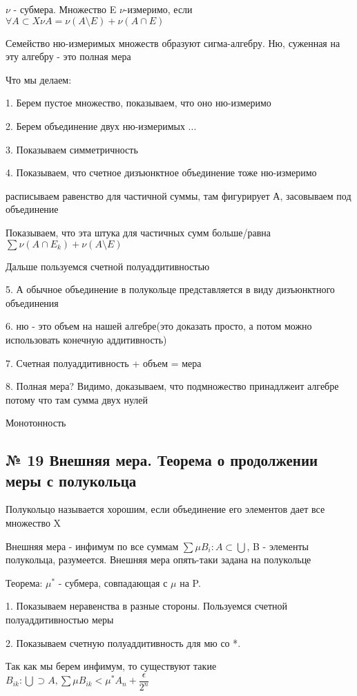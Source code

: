 \documentclass{article}
\begin{document}
$\nu$ - субмера. Множество E $\nu$-измеримо, если $\forall A \subset X \nu A = \nu (A \setminus E) + \nu (A \cap E)$

Семейство ню-измеримых множеств образуют сигма-алгебру. Ню, суженная на эту алгебру - это полная мера

Что мы делаем:

1. Берем пустое множество, показываем, что оно ню-измеримо

2. Берем объединение двух ню-измеримых ...

3. Показываем симметричность

4. Показываем, что счетное дизъюнктное объединение тоже ню-измеримо

расписываем равенство для частичной суммы, там фигурирует А, засовываем под объединение 

Показываем, что эта штука для частичных сумм больше/равна $\sum{\nu (A \cap E_k)} + \nu (A\setminus E)$

Дальше пользуемся счетной полуаддитивностью

5. А обычное объединение в полукольце представляется в виду дизъюнктного объединения

6. ню - это объем на нашей алгебре(это доказать просто, а потом можно использовать конечную аддитивность)

7. Счетная полуаддитивность + объем = мера

8. Полная мера? Видимо, доказываем, что подмножество принадлжеит алгебре потому что там сумма двух нулей

Монотонность

\subsection{ \footnotesize № 19 Внешняя мера. Теорема о продолжении меры с полукольца}

Полукольцо называется хорошим, если объединение его элементов дает все множество X

Внешняя мера - инфимум по все суммам $\sum{\mu B_i} : A \subset \bigcup$, B - элементы полукольца, разумеется. Внешняя мера опять-таки задана на полукольце

Теорема: $\mu^*$ - субмера, совпадающая с $\mu$ на P. 

1. Показываем неравенства в разные стороны. Пользуемся счетной полуаддитивностью меры

2. Показываем счетную полуаддитивность для мю со *. 

Так как мы берем инфимум, то существуют такие $B_{ik} : \bigcup \supset A, \sum{\mu B_{ik}} < \mu^*A_n + \dfrac{\epsilon}{2^n}$
\end{document}
